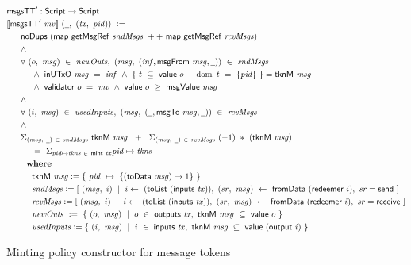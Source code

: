 \begin{figure}
  \begin{align*}
    & \msgsTT' : \Script \to \Script \\
    &\applyMPScript{\msgsTT'~\var{mv}}~(\wcard,~(\var{tx},~\var{pid}))~\leteq \\
    &~~~~~\fun{noDups}~(\fun{map}~\fun{getMsgRef}~\var{sndMsgs}~++~\fun{map}~\fun{getMsgRef}~\var{rcvMsgs}) \\
    &~~~~~\wedge \\
    &~~~~~\forall~(o,~\var{msg})~\in~\var{newOuts},~ (\var{msg},~(\var{inf}, \fun{msgFrom}~\var{msg}, \wcard))~\in~\var{sndMsgs} \\
    &~~~~~~~~~\wedge~\fun{inUTxO}~\var{msg}~=~\var{inf}~\wedge~\{~t~ \subseteq~\val~o~\mid~\dom~t~=~\{\var{pid}\}~\} = \fun{tknM}~\var{msg} \\
    &~~~~~~~~~\wedge~\validator~o~=~\var{mv}~\wedge~\val~o~\geq~\fun{msgValue}~\var{msg} \\
    &~~~~~\wedge \\
    &~~~~~\forall~(i,~\var{msg})~\in~\var{usedInputs},~(\var{msg},~(\wcard, \fun{msgTo}~\var{msg}, \wcard))~\in~\var{rcvMsgs}\\
    &~~~~~\wedge \\
    &~~~~~\Sigma_{(\var{msg},~\wcard)~\in~\var{sndMsgs}}~\fun{tknM}~\var{msg} ~~+~~
    \Sigma_{(\var{msg},~\wcard)~\in~\var{rcvMsgs}}~(-1) ~*~ (\fun{tknM}~\var{msg}) ~\\
    &~~~~~~~~~=~ \Sigma_{\var{pid} \mapsto \var{tkns}~\in~\mint~\var{tx}} \var{pid} \mapsto \var{tkns} \\
    &~~~~~\where \\
    &~~~~~~~~~\fun{tknM}~\var{msg} \leteq \{~\var{pid} ~\mapsto~ \{(\fun{toData}~\var{msg}) \mapsto 1\}~\} \\
    &~~~~~~~~~\var{sndMsgs} \leteq [~ (\var{msg},~i)~\mid~i\leftarrow~(\fun{toList}~(\inputs~\var{tx})),
    ~(\var{sr},~\var{msg})~ \leftarrow~ \fun{fromData}~(\redeemer~i),~\var{sr}=\send~] \\
    &~~~~~~~~~\var{rcvMsgs} \leteq [~ (\var{msg},~i)~\mid~i\leftarrow~(\fun{toList}~(\inputs~\var{tx})),
    ~(\var{sr},~\var{msg})~\leftarrow~\fun{fromData}~(\redeemer~i),~\var{sr}=\receive~] \\
    &~~~~~~~~~\var{newOuts}~\leteq ~\{~(o,~\var{msg})~\mid~o~\in~\outputs~\var{tx},~
    \fun{tknM}~\var{msg}~\subseteq~\val~o~\} \\
    &~~~~~~~~~\var{usedInputs} \leteq \{~ (i,~\var{msg})~\mid~
    i~ \in~ \inputs~\var{tx},~\fun{tknM}~\var{msg}~\subseteq~\val~(\fun{output}~i) ~\} \\
  \end{align*}
\caption{Minting policy constructor for message tokens}
\label{fig:msgs-codeTT}
\end{figure}

